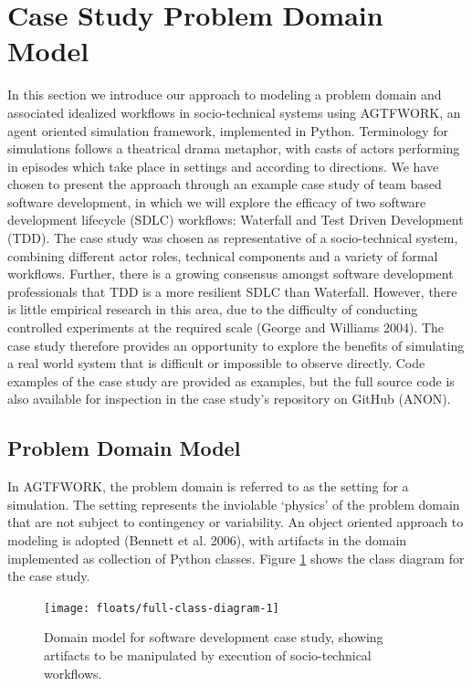 \documentclass{llncs}
\begin{document}
\section{Case Study Problem Domain Model}

In this section we introduce our approach to modeling a problem domain and associated idealized workflows in
socio-technical systems using AGTFWORK, an agent oriented simulation framework, implemented in Python.  Terminology for
simulations follows a theatrical drama metaphor, with casts of actors performing in episodes which take place in
settings and according to directions. We have chosen to present the approach through an example case study of team based
software development, in which we will explore the efficacy of two software development lifecycle (SDLC) workflows:
Waterfall and Test Driven Development (TDD).  The case study was chosen as representative of a socio-technical system,
combining different actor roles, technical components and a variety of formal workflows.  Further, there is a growing
consensus amongst software development professionals that TDD is a more resilient SDLC than Waterfall. However, there is
little empirical research in this area, due to the difficulty of conducting controlled experiments at the required scale
(George and Williams 2004). The case study therefore provides an opportunity to explore the benefits of simulating a
real world system that is difficult or impossible to observe directly. Code examples of the case study are provided as
examples, but the full source code is also available for inspection in the case study’s repository on GitHub (ANON).

\subsection{Problem Domain Model}

In AGTFWORK, the problem domain is referred to as the setting for a simulation.  The setting represents the inviolable
‘physics’ of the problem domain that are not subject to contingency or variability. An object oriented approach to
modeling is adopted (Bennett et al. 2006), with artifacts in the domain implemented as collection of Python classes.
Figure \ref{fig:domain} shows the class diagram for the case study.

\begin{figure}
  \centering
  \texttt{[image: floats/full-class-diagram-1]}
  \caption{Domain model for software development case study, showing artifacts to be manipulated by execution of
    socio-technical workflows.}
  \label{fig:domain}
\end{figure}
\end{document}
